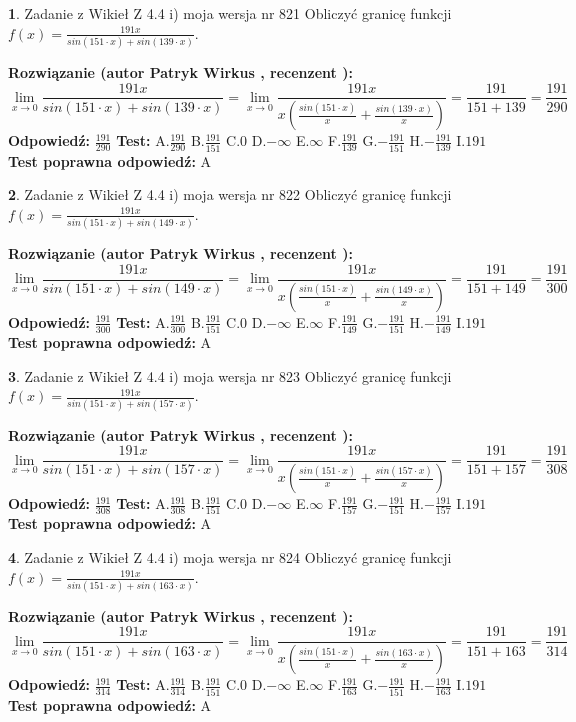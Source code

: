 \documentclass[12pt, a4paper]{article}
\theoremstyle{definition} %
\newtheorem{zad}{}
\newcommand{\zadStart}[1]{\begin{zad}#1\newline}
\newcommand{\zadStop}{\end{zad}}
\newcommand{\rozwStart}[2]{\noindent \textbf{Rozwiązanie (autor #1 , recenzent #2): }\newline}
\newcommand{\rozwStop}{\newline}
\newcommand{\odpStart}{\noindent \textbf{Odpowiedź:}\newline}
\newcommand{\odpStop}{\newline}
\newcommand{\testStart}{\noindent \textbf{Test:}\newline}
\newcommand{\testStop}{\newline}
\newcommand{\kluczStart}{\noindent \textbf{Test poprawna odpowiedź:}\newline}
\newcommand{\kluczStop}{\newline}
\begin{document}
\zadStart{Zadanie z Wikieł Z 4.4 i) moja wersja nr 821}
Obliczyć granicę funkcji $f(x)=\frac{191x}{sin(151\cdot x) +sin(139\cdot x)}$.
\zadStop
\rozwStart{Patryk Wirkus}{}
$$\lim\limits_{x\to 0}\frac{191x}{sin(151\cdot x) +sin(139\cdot x)}=\lim\limits_{x\to 0}\frac{191x}{x(\frac{sin(151\cdot x)}{x}+\frac{sin(139\cdot x)}{x})}=\frac{191}{151+139} = \frac{191}{290}$$
\rozwStop
\odpStart
$\frac{191}{290}$
\odpStop
\testStart
A.$\frac{191}{290}$
B.$\frac{191}{151}$
C.$0$
D.$-\infty$
E.$\infty$
F.$\frac{191}{139}$
G.$-\frac{191}{151}$
H.$-\frac{191}{139}$
I.$191$
\testStop
\kluczStart
A
\kluczStop



\zadStart{Zadanie z Wikieł Z 4.4 i) moja wersja nr 822}
Obliczyć granicę funkcji $f(x)=\frac{191x}{sin(151\cdot x) +sin(149\cdot x)}$.
\zadStop
\rozwStart{Patryk Wirkus}{}
$$\lim\limits_{x\to 0}\frac{191x}{sin(151\cdot x) +sin(149\cdot x)}=\lim\limits_{x\to 0}\frac{191x}{x(\frac{sin(151\cdot x)}{x}+\frac{sin(149\cdot x)}{x})}=\frac{191}{151+149} = \frac{191}{300}$$
\rozwStop
\odpStart
$\frac{191}{300}$
\odpStop
\testStart
A.$\frac{191}{300}$
B.$\frac{191}{151}$
C.$0$
D.$-\infty$
E.$\infty$
F.$\frac{191}{149}$
G.$-\frac{191}{151}$
H.$-\frac{191}{149}$
I.$191$
\testStop
\kluczStart
A
\kluczStop



\zadStart{Zadanie z Wikieł Z 4.4 i) moja wersja nr 823}
Obliczyć granicę funkcji $f(x)=\frac{191x}{sin(151\cdot x) +sin(157\cdot x)}$.
\zadStop
\rozwStart{Patryk Wirkus}{}
$$\lim\limits_{x\to 0}\frac{191x}{sin(151\cdot x) +sin(157\cdot x)}=\lim\limits_{x\to 0}\frac{191x}{x(\frac{sin(151\cdot x)}{x}+\frac{sin(157\cdot x)}{x})}=\frac{191}{151+157} = \frac{191}{308}$$
\rozwStop
\odpStart
$\frac{191}{308}$
\odpStop
\testStart
A.$\frac{191}{308}$
B.$\frac{191}{151}$
C.$0$
D.$-\infty$
E.$\infty$
F.$\frac{191}{157}$
G.$-\frac{191}{151}$
H.$-\frac{191}{157}$
I.$191$
\testStop
\kluczStart
A
\kluczStop



\zadStart{Zadanie z Wikieł Z 4.4 i) moja wersja nr 824}
Obliczyć granicę funkcji $f(x)=\frac{191x}{sin(151\cdot x) +sin(163\cdot x)}$.
\zadStop
\rozwStart{Patryk Wirkus}{}
$$\lim\limits_{x\to 0}\frac{191x}{sin(151\cdot x) +sin(163\cdot x)}=\lim\limits_{x\to 0}\frac{191x}{x(\frac{sin(151\cdot x)}{x}+\frac{sin(163\cdot x)}{x})}=\frac{191}{151+163} = \frac{191}{314}$$
\rozwStop
\odpStart
$\frac{191}{314}$
\odpStop
\testStart
A.$\frac{191}{314}$
B.$\frac{191}{151}$
C.$0$
D.$-\infty$
E.$\infty$
F.$\frac{191}{163}$
G.$-\frac{191}{151}$
H.$-\frac{191}{163}$
I.$191$
\testStop
\kluczStart
A
\kluczStop
\end{document}

